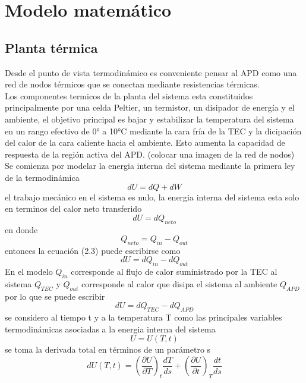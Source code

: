 \chapter{Modelo matemático}
\section{Planta térmica}
Desde el punto de vista termodinámico es conveniente pensar al APD como una red de nodos térmicos que se conectan mediante resistencias térmicas.\\
Los componentes termicos de la planta del sistema esta constituidos principalmente por una celda Peltier, un termistor, un disipador de energía y el ambiente, el objetivo principal es bajar y estabilizar la temperatura del sistema en un rango efectivo de 0° a 10°C mediante la cara fría de la TEC y la dicipación del calor de la cara caliente hacia el ambiente. Esto aumenta la capacidad de respuesta de la región activa del APD.
(colocar una imagen de la red de nodos)\\
Se comienza por modelar la energia interna del sistema mediante la primera ley de la termodinámica 
\begin{equation}
    dU = {d}Q + {d}W
\end{equation}
el trabajo mecánico en el sistema es nulo, la energia interna del sistema esta solo en terminos del calor neto transferido 
\begin{equation}
     dU = {d}Q_{neto}
\end{equation}
en donde 
\begin{equation}
    Q_{neto} = Q_{in}-Q_{out}
\end{equation}
entonces la ecuación (2.3) puede escribirse como
\begin{equation}
    dU = dQ_{in}-dQ_{out}
\end{equation}
En el modelo $Q_{in}$ corresponde al flujo de calor suministrado por la TEC al sistema $Q_{TEC}$ y $Q_{out}$ corresponde al calor que disipa el sistema al ambiente $Q_{APD}$ por lo que se puede escribir 
\begin{equation}
    dU = dQ_{TEC}-dQ_{APD}
\end{equation}
se considero al tiempo t y a la temperatura T como las principales variables termodinámicas asociadas a la energia interna del sistema 
\begin{equation}
    U = U(T,t)
\end{equation}
se toma la derivada total en términos de un parámetro s 
\begin{equation}
    dU(T,t) = (\frac{\partial U}{\partial T})_{t} \frac{dT}{ds} + (\frac{\partial U}{\partial t})_{T}\frac{dt}{ds}
\end{equation}

